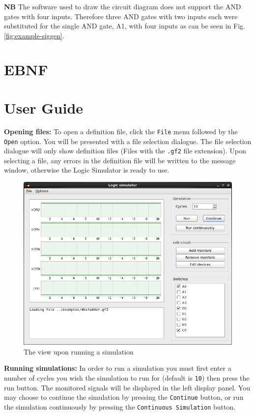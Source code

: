 \documentclass[a4paper,10pt]{article}
\begin{document}
\textbf{NB} The software used to draw the circuit diagram does not support the AND gates with four inputs. Therefore three AND gates with two inputs each were substituted for the single AND gate, A1, with four inputs as can be seen in Fig. \ref{fig:example-siggen}.

\pagebreak

\section{EBNF}
\label{sec:EBNF}

\pagebreak

\section{User Guide}
\label{sec:guide}

\textbf{Opening files:} To open a definition file, click the \texttt{File} menu followed by the \texttt{Open} option. You will be presented with a file selection dialogue. The file selection dialogue will only show definition files (Files with the \texttt{.gf2} file extension). Upon selecting a file, any errors in the definition file will be written to the message window, otherwise the Logic Simulator is ready to use. 

\begin{figure}[h]
        \centering
        \includegraphics[width=.8\textwidth]{../../report2/jam96/simulation}
        \caption{The view upon running a simulation}
        \label{fig:simulation}
\end{figure}

\textbf{Running simulations:} In order to run a simulation you must first enter a number of cycles you wish the simulation to run for (default is \texttt{10}) then press the run button. The monitored signals will be displayed in the left display panel. You may choose to continue the simulation by pressing the \texttt{Continue} button, or run the simulation continuously by pressing the \texttt{Continuous Simulation} button.
\end{document}
